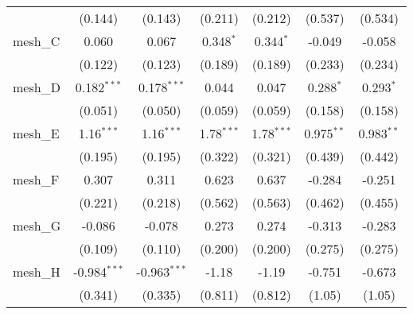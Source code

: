 \begin{tabular}{lcccccc}
                                                               & (0.144)        & (0.143)        & (0.211)        & (0.212)        & (0.537)        & (0.534)\\   
   mesh\_C                                                     & 0.060          & 0.067          & 0.348$^{*}$    & 0.344$^{*}$    & -0.049         & -0.058\\   
                                                               & (0.122)        & (0.123)        & (0.189)        & (0.189)        & (0.233)        & (0.234)\\   
   mesh\_D                                                     & 0.182$^{***}$  & 0.178$^{***}$  & 0.044          & 0.047          & 0.288$^{*}$    & 0.293$^{*}$\\   
                                                               & (0.051)        & (0.050)        & (0.059)        & (0.059)        & (0.158)        & (0.158)\\   
   mesh\_E                                                     & 1.16$^{***}$   & 1.16$^{***}$   & 1.78$^{***}$   & 1.78$^{***}$   & 0.975$^{**}$   & 0.983$^{**}$\\   
                                                               & (0.195)        & (0.195)        & (0.322)        & (0.321)        & (0.439)        & (0.442)\\   
   mesh\_F                                                     & 0.307          & 0.311          & 0.623          & 0.637          & -0.284         & -0.251\\   
                                                               & (0.221)        & (0.218)        & (0.562)        & (0.563)        & (0.462)        & (0.455)\\   
   mesh\_G                                                     & -0.086         & -0.078         & 0.273          & 0.274          & -0.313         & -0.283\\   
                                                               & (0.109)        & (0.110)        & (0.200)        & (0.200)        & (0.275)        & (0.275)\\   
   mesh\_H                                                     & -0.984$^{***}$ & -0.963$^{***}$ & -1.18          & -1.19          & -0.751         & -0.673\\   
                                                               & (0.341)        & (0.335)        & (0.811)        & (0.812)        & (1.05)         & (1.05)\\   

\end{tabular}
